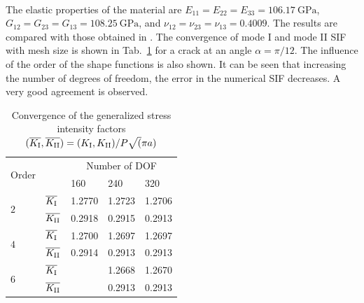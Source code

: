 \paragraph{}
The elastic properties of the material are $E_{11} = E_{22}= E_{33}=\SI{106.17}{\giga \pascal}$, $G_{12} = G_{23} = G_{13} = \SI{108.25}{\giga \pascal}$, and $\nu_{12} = \nu_{23} = \nu_{13} = 0.4009$.
The results are compared with those obtained in \citep{Banks2005}.
The convergence of mode \RN{1} and mode \RN{2} SIF with mesh size is shown in Tab.~\ref{iso_tab:angled_crack_convergence} for a crack at an angle $\alpha = \pi/12$.
The influence of the order of the shape functions is also shown.
It can be seen that increasing the number of degrees of freedom, the error in the numerical SIF decreases.
A very good agreement is observed.

\begin{table}
\caption{Convergence of the generalized stress intensity factors $
    (\overline{K_{\mathrm I}}, \overline{K_{\mathrm{II}}}) =
    (K_{\mathrm I},K_{\mathrm{II}}) /
    P\sqrt(\pi a)
    $}
\label{iso_tab:angled_crack_convergence}
\begin{tabularx}{\textwidth}{XXXXX}
    \toprule
    \multirow{2}{*}{Order}& & \multicolumn{3}{c}{Number of DOF} \\
    \cmidrule{3-5}
    & & 160 & 240 & 320 \\
    \multirow{2}{*}{$2$}    &   $\overline{K_{\mathrm I}}$   &   1.2770  &   1.2723  &   1.2706  \\
                            &   $\overline{K_{\mathrm{II}}}$   &   0.2918  &   0.2915  &   0.2913  \\
    \multirow{2}{*}{$4$}    &   $\overline{K_{\mathrm I}}$   &   1.2700  &   1.2697  &   1.2697  \\
                            &   $\overline{K_{\mathrm{II}}}$   &   0.2914  &   0.2913  &   0.2913  \\
    \multirow{2}{*}{$6$}    &   $\overline{K_{\mathrm I}}$   &           &   1.2668  &   1.2670  \\
                            &   $\overline{K_{\mathrm{II}}}$   &           &   0.2913  &   0.2913  \\                           
    \midrule
    \bottomrule
\end{tabularx}
\end{table}

